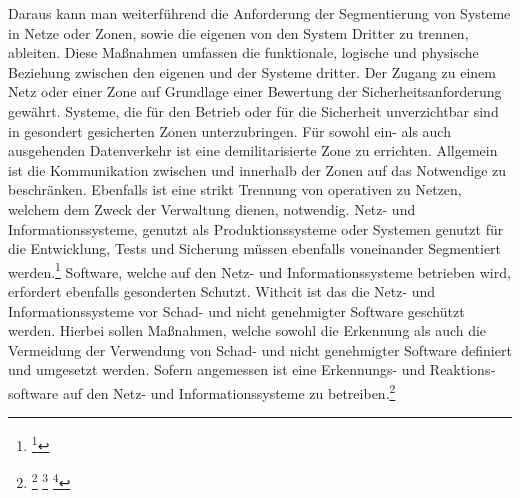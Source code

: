 \documentclass[11pt,a4paper,hidelinks]{article}   %
\begin{document}
\begin{itemize}
            \end{itemize} Daraus kann man weiterführend die Anforderung der Segmentierung von Systeme in Netze oder Zonen, sowie die eigenen von den System Dritter zu trennen, ableiten. Diese Maßnahmen umfassen die funktionale, logische und physische Beziehung zwischen den eigenen und der Systeme dritter. Der Zugang zu einem Netz oder einer Zone auf Grundlage einer Bewertung der Sicherheitsanforderung gewährt. Systeme, die für den Betrieb oder für die Sicherheit unverzichtbar sind in gesondert gesicherten Zonen unterzubringen. Für sowohl ein- als auch ausgehenden Datenverkehr ist eine demilitarisierte Zone zu errichten. Allgemein ist die Kommunikation zwischen und innerhalb der Zonen auf das Notwendige zu beschränken. Ebenfalls ist eine strikt Trennung von operativen zu Netzen, welchem dem Zweck der Verwaltung dienen, notwendig. Netz- und Informationssysteme, genutzt als Produktionssysteme oder Systemen genutzt für die Entwicklung, Tests und Sicherung müssen ebenfalls voneinander Segmentiert werden.\footnote{\footcite[Vgl.][, Anhang, Nummer 6.8.2.]{EU2024-2690}} Software, welche auf den Netz- und Informationssysteme betrieben wird, erfordert ebenfalls gesonderten Schutzt. Withcit ist das die Netz- und Informationssysteme vor Schad- und nicht genehmigter Software geschützt werden. Hierbei sollen Maßnahmen, welche sowohl die Erkennung als auch die Vermeidung der Verwendung von Schad- und nicht genehmigter Software definiert und umgesetzt werden. Sofern angemessen ist eine Erkennungs- und Reaktions­software auf den Netz- und Informationssysteme zu betreiben.\footnote{
                \footcite[Vgl.][, Anhang, Nummer 6.9.1. \& 6.9.2.]{EU2024-2690}
                \footcite[Vgl.][, §31 Absatz 2]{NIS2UmsuCG} %
                \footcite[Vgl.][, §53 Absatz 1]{NIS2UmsuCG} %
            }
            
\end{document}
